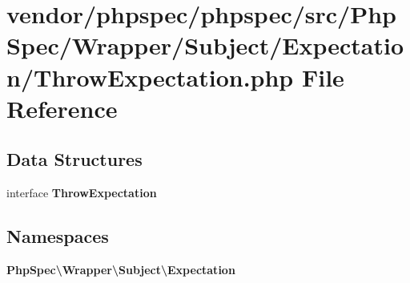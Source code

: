 \section{vendor/phpspec/phpspec/src/\+Php\+Spec/\+Wrapper/\+Subject/\+Expectation/\+Throw\+Expectation.php File Reference}
\label{_throw_expectation_8php}
\subsection*{Data Structures}
\begin{DoxyCompactItemize}
\item 
interface {\bf Throw\+Expectation}
\end{DoxyCompactItemize}
\subsection*{Namespaces}
\begin{DoxyCompactItemize}
\item 
 {\bf Php\+Spec\textbackslash{}\+Wrapper\textbackslash{}\+Subject\textbackslash{}\+Expectation}
\end{DoxyCompactItemize}
